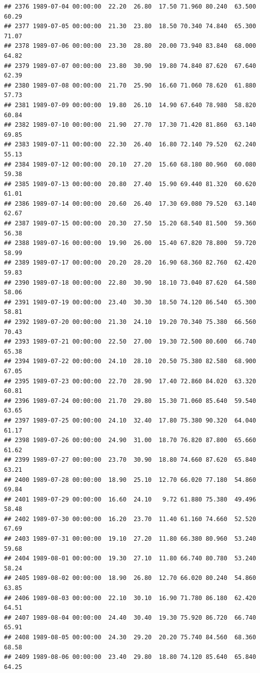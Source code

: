 \documentclass{article}\usepackage{graphicx, color}
\makeatletter
\newenvironment{kframe}{%
 \def\at@end@of@kframe{}%
 \ifinner\ifhmode%
  \def\at@end@of@kframe{\end{minipage}}%
  \begin{minipage}{\columnwidth}%
 \fi\fi%
 \def\FrameCommand##1{\hskip\@totalleftmargin \hskip-\fboxsep
 \colorbox{shadecolor}{##1}\hskip-\fboxsep
     \hskip-\linewidth \hskip-\@totalleftmargin \hskip\columnwidth}%
 \MakeFramed {\advance\hsize-\width
   \@totalleftmargin\z@ \linewidth\hsize
   \@setminipage}}%
 {\par\unskip\endMakeFramed%
 \at@end@of@kframe}
\newenvironment{knitrout}{}{} %
\makeatother
\begin{document}
\begin{knitrout}
\begin{kframe}
\begin{verbatim}
## 2376 1989-07-04 00:00:00  22.20  26.80  17.50 71.960 80.240  63.500  60.29
## 2377 1989-07-05 00:00:00  21.30  23.80  18.50 70.340 74.840  65.300  71.07
## 2378 1989-07-06 00:00:00  23.30  28.80  20.00 73.940 83.840  68.000  64.82
## 2379 1989-07-07 00:00:00  23.80  30.90  19.80 74.840 87.620  67.640  62.39
## 2380 1989-07-08 00:00:00  21.70  25.90  16.60 71.060 78.620  61.880  57.73
## 2381 1989-07-09 00:00:00  19.80  26.10  14.90 67.640 78.980  58.820  60.84
## 2382 1989-07-10 00:00:00  21.90  27.70  17.30 71.420 81.860  63.140  69.85
## 2383 1989-07-11 00:00:00  22.30  26.40  16.80 72.140 79.520  62.240  55.13
## 2384 1989-07-12 00:00:00  20.10  27.20  15.60 68.180 80.960  60.080  59.38
## 2385 1989-07-13 00:00:00  20.80  27.40  15.90 69.440 81.320  60.620  61.01
## 2386 1989-07-14 00:00:00  20.60  26.40  17.30 69.080 79.520  63.140  62.67
## 2387 1989-07-15 00:00:00  20.30  27.50  15.20 68.540 81.500  59.360  56.38
## 2388 1989-07-16 00:00:00  19.90  26.00  15.40 67.820 78.800  59.720  58.99
## 2389 1989-07-17 00:00:00  20.20  28.20  16.90 68.360 82.760  62.420  59.83
## 2390 1989-07-18 00:00:00  22.80  30.90  18.10 73.040 87.620  64.580  58.06
## 2391 1989-07-19 00:00:00  23.40  30.30  18.50 74.120 86.540  65.300  58.81
## 2392 1989-07-20 00:00:00  21.30  24.10  19.20 70.340 75.380  66.560  70.43
## 2393 1989-07-21 00:00:00  22.50  27.00  19.30 72.500 80.600  66.740  65.38
## 2394 1989-07-22 00:00:00  24.10  28.10  20.50 75.380 82.580  68.900  67.05
## 2395 1989-07-23 00:00:00  22.70  28.90  17.40 72.860 84.020  63.320  60.81
## 2396 1989-07-24 00:00:00  21.70  29.80  15.30 71.060 85.640  59.540  63.65
## 2397 1989-07-25 00:00:00  24.10  32.40  17.80 75.380 90.320  64.040  61.17
## 2398 1989-07-26 00:00:00  24.90  31.00  18.70 76.820 87.800  65.660  61.62
## 2399 1989-07-27 00:00:00  23.70  30.90  18.80 74.660 87.620  65.840  63.21
## 2400 1989-07-28 00:00:00  18.90  25.10  12.70 66.020 77.180  54.860  69.84
## 2401 1989-07-29 00:00:00  16.60  24.10   9.72 61.880 75.380  49.496  58.48
## 2402 1989-07-30 00:00:00  16.20  23.70  11.40 61.160 74.660  52.520  67.69
## 2403 1989-07-31 00:00:00  19.10  27.20  11.80 66.380 80.960  53.240  59.68
## 2404 1989-08-01 00:00:00  19.30  27.10  11.80 66.740 80.780  53.240  58.24
## 2405 1989-08-02 00:00:00  18.90  26.80  12.70 66.020 80.240  54.860  63.85
## 2406 1989-08-03 00:00:00  22.10  30.10  16.90 71.780 86.180  62.420  64.51
## 2407 1989-08-04 00:00:00  24.40  30.40  19.30 75.920 86.720  66.740  65.91
## 2408 1989-08-05 00:00:00  24.30  29.20  20.20 75.740 84.560  68.360  68.58
## 2409 1989-08-06 00:00:00  23.40  29.80  18.80 74.120 85.640  65.840  64.25

\end{verbatim}
\end{kframe}
\end{knitrout}
\end{document}
